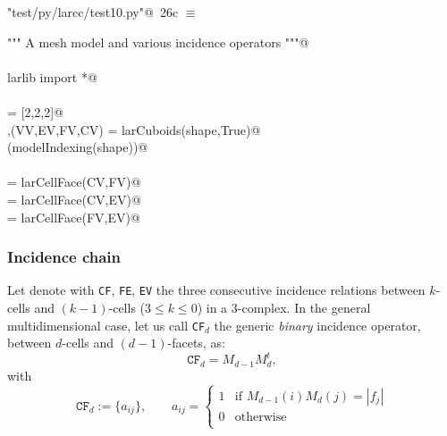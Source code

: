 \documentclass[11pt,oneside]{article}    %
\begin{document}
\begin{flushleft} \small \label{scrap43}
\protect{}\verb@"test/py/larcc/test10.py"@\nobreak\ {\footnotesize 26c }$\equiv$
\vspace{-1ex}
\begin{list}{}{} \item
\mbox{}\verb@""" A mesh model and various incidence operators """@\\
\mbox{}\verb@@\\
\mbox{}\verb@from larlib import *@\\
\mbox{}\verb@@\\
\mbox{}\verb@shape = [2,2,2]@\\
\mbox{}\verb@V,(VV,EV,FV,CV) = larCuboids(shape,True)@\\
\mbox{}\verb@VIEW(modelIndexing(shape))@\\
\mbox{}\verb@@\\
\mbox{}\verb@CF = larCellFace(CV,FV)@\\
\mbox{}\verb@CE = larCellFace(CV,EV)@\\
\mbox{}\verb@FE = larCellFace(FV,EV)@\\
\mbox{}\verb@@{\NWsep}
\end{list}
\vspace{-2ex}
\end{flushleft}

\subsubsection{Incidence chain}

Let denote with \texttt{CF}, \texttt{FE}, \texttt{EV} the three consecutive incidence relations between $k$-cells and $(k-1)$-cells ($3\leq k\leq 0$) in a 3-complex. In the general multidimensional case, let us call \texttt{CF}$_d$  the generic \emph{binary} incidence operator, between $d$-cells and $(d-1)$-facets, as:
\[
\texttt{CF}_d = M_{d-1} M_d^t, 
\]
with
\[
\texttt{CF}_d := \{a_{ij}\}, \qquad a_{ij} = 
\left\{
\begin{array}{cl}
1 & \mbox{if\ } M_{d-1}(i) M_d(j) = |f_j|  \\
0 & \mbox{otherwise}  \\  
\end{array}
\right.
\]
\end{document}
